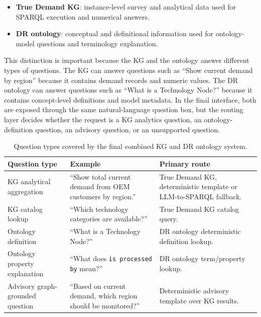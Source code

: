 \documentclass[
  12pt,
  english,
  oneside]{report}
\begin{document}
\begin{itemize}
    \item \textbf{True Demand KG}: instance-level survey and analytical data used for SPARQL execution and numerical answers.
    \item \textbf{DR ontology}: conceptual and definitional information used for ontology-model questions and terminology explanation.
\end{itemize}

This distinction is important because the KG and the ontology answer different types of questions. The KG can answer questions such as ``Show current demand by region'' because it contains demand records and numeric values. The DR ontology can answer questions such as ``What is a Technology Node?'' because it contains concept-level definitions and model metadata. In the final interface, both are exposed through the same natural-language question box, but the routing layer decides whether the request is a KG analytics question, an ontology-definition question, an advisory question, or an unsupported question.

\begin{table}[htbp]
\centering
\caption{Question types covered by the final combined KG and DR ontology system.}
\label{tab:kg-dr-question-types}
\small
\begin{tabularx}{\textwidth}{
>{\raggedright\arraybackslash}p{3.8cm}
>{\raggedright\arraybackslash}p{5.0cm}
>{\raggedright\arraybackslash}X
}
\toprule
\textbf{Question type} & \textbf{Example} & \textbf{Primary route} \\
\midrule
KG analytical aggregation & ``Show total current demand from OEM customers by region.'' & True Demand KG, deterministic template or LLM-to-SPARQL fallback. \\
KG catalog lookup & ``Which technology categories are available?'' & True Demand KG catalog query. \\
Ontology definition & ``What is a Technology Node?'' & DR ontology deterministic definition lookup. \\
Ontology property explanation & ``What does \texttt{is processed by} mean?'' & DR ontology term/property lookup. \\
Advisory graph-grounded question & ``Based on current demand, which region should be monitored?'' & Deterministic advisory template over KG results. \\
\bottomrule
\end{tabularx}
\end{table}
\end{document}
